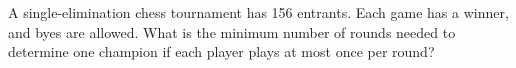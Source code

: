 A single-elimination chess tournament has 156 entrants. Each game has a winner, and byes are allowed. What is the minimum number of rounds needed to determine one champion if each player plays at most once per round?

